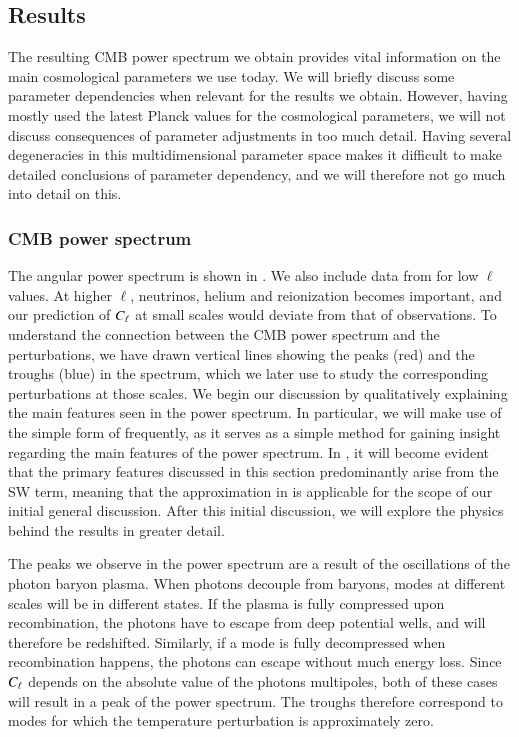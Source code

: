 \subsection{Results}\label{ssec:M4:results}
The resulting CMB power spectrum we obtain provides vital information on the main cosmological parameters we use today. We will briefly discuss some parameter dependencies when relevant for the results we obtain. However, having mostly used the latest Planck values for the cosmological parameters, we will not discuss consequences of parameter adjustments in too much detail. Having several degeneracies in this multidimensional parameter space makes it difficult to make detailed conclusions of parameter dependency, and we will therefore not go much into detail on this.  

\subsubsection{CMB power spectrum} \label{sssec:M4:results:angular_power_spectrum}
The angular power spectrum is shown in . We also include data from \cite{Planck2020} for low $\ell$ values. At higher $\ell$, neutrinos, helium and reionization becomes important, and our prediction of $C_\ell$ at small scales would deviate from that of observations. To understand the connection between the CMB power spectrum and the perturbations, we have drawn vertical lines showing the peaks (red) and the troughs (blue) in the spectrum, which we later use to study the corresponding perturbations at those scales. We begin our discussion by qualitatively explaining the main features seen in the power spectrum. In particular, we will make use of the simple form of  frequently, as it serves as a simple method for gaining insight regarding the main features of the power spectrum. In , it will become evident that the primary features discussed in this section predominantly arise from the SW term, meaning that the approximation in  is applicable for the scope of our initial general discussion. After this initial discussion, we will explore the physics behind the results in greater detail.

The peaks we observe in the power spectrum are a result of the oscillations of the photon baryon plasma. When photons decouple from baryons, modes at different scales will be in different states. If the plasma is fully compressed upon recombination, the photons have to escape from deep potential wells, and will therefore be redshifted. Similarly, if a mode is fully decompressed when recombination happens, the photons can escape without much energy loss. Since $C_\ell$ depends on the absolute value of the photons multipoles, both of these cases will result in a peak of the power spectrum. The troughs therefore correspond to modes for which the temperature perturbation is approximately zero.  

